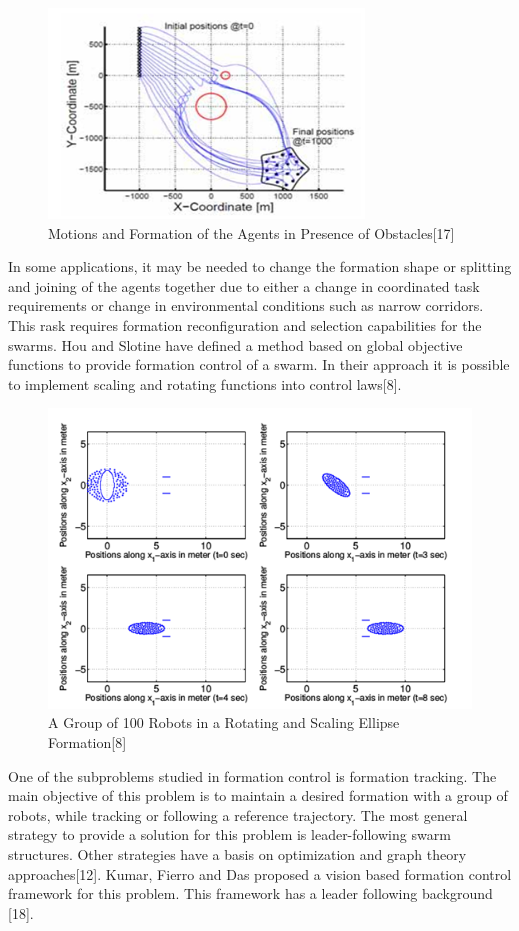 \begin{figure}[H]
	\caption{Motions and Formation of the Agents in Presence of Obstacles[17]}
	\centering
	\includegraphics[scale = 1]{samitha}
\end{figure} 

In some applications, it may be needed to change the formation shape or splitting and joining of the agents together due to either a change in coordinated task requirements or change in environmental conditions such as narrow corridors.  This rask requires formation reconfiguration and selection capabilities for the swarms. Hou and Slotine have defined a method based on global objective functions to provide formation control of a swarm. In their approach it is possible to implement scaling and rotating functions into control laws[8].

\begin{figure}[H]
	\caption{A Group of 100 Robots in a Rotating and Scaling Ellipse Formation[8]}
	\centering
	\includegraphics[scale = 1]{slotine}
\end{figure} 

One of the subproblems studied in formation control is formation tracking. The main objective of this problem is to maintain a desired formation with a group of robots, while tracking or following a reference trajectory. The most general strategy to provide a solution for this problem is leader-following swarm structures. Other strategies have a basis on optimization and graph theory approaches[12]. Kumar, Fierro and Das proposed a vision based formation control framework  for this problem. This framework has a leader following background [18]. 

